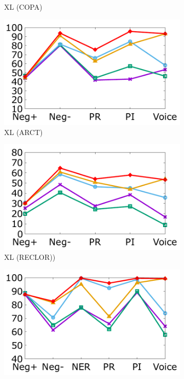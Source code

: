 \begin{figure}[!th]
\begin{subfigure}[b]{0.24\textwidth}
\caption{XL (COPA)}
\label{fig:copa_xlnet}
\end{subfigure}
\hfill
\begin{subfigure}[b]{0.24\textwidth}
\centering
\includegraphics[width=\columnwidth]{data/arct_xlnet.pdf}
\caption{XL (ARCT)}
\label{fig:arct_xlnet}
\end{subfigure}
\hfill
\begin{subfigure}[b]{0.24\textwidth}
\centering
\includegraphics[width=\columnwidth]{data/reclor_xlnet.pdf}
\caption{XL (RECLOR))}
\label{fig:reclor_xlnet}
\end{subfigure}
\newpage
\begin{subfigure}[b]{0.24\textwidth}
\centering
\includegraphics[width=\columnwidth]{data/roc_roberta.pdf}

\end{subfigure}
\end{figure}
